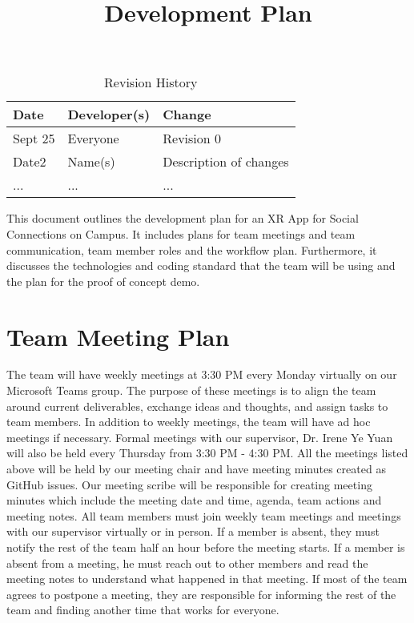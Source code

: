 \documentclass{article}
\title{Development Plan\\\progname}
\author{\authname}
\date{}
\begin{document}
\maketitle

\begin{table}[hp]
\caption{Revision History} \label{TblRevisionHistory}
\begin{tabularx}{\textwidth}{llX}
\toprule
\textbf{Date} & \textbf{Developer(s)} & \textbf{Change}\\
\midrule
Sept 25 & Everyone & Revision 0\\
Date2 & Name(s) & Description of changes\\
... & ... & ...\\
\bottomrule
\end{tabularx}
\end{table}

This document outlines the development plan for an XR App for Social Connections on Campus. It includes plans for team meetings and team communication, team member roles and the workflow plan.  Furthermore,  it discusses the technologies and coding standard that the team will be using and the plan for the proof of concept demo. 

\section{Team Meeting Plan}
\quad The team will have weekly meetings at 3:30 PM every Monday virtually on our Microsoft Teams group. The purpose of these meetings is to align the team around current deliverables, exchange ideas and thoughts, and assign tasks to team members. In addition to weekly meetings,  the team will have ad hoc meetings if necessary. Formal meetings with our supervisor, Dr. Irene Ye Yuan will also be held every Thursday from 3:30 PM - 4:30 PM.  All the meetings listed above will be held by our meeting chair and have meeting minutes created as GitHub issues. Our meeting scribe will be responsible for creating meeting minutes which include the meeting date and time,  agenda, team actions and meeting notes.
\quad All team members must join weekly team meetings and meetings with our supervisor virtually or in person.  If a member is absent,  they must notify the rest of the team half an hour before the meeting starts.  If a member is absent from a meeting,  he must reach out to other members and read the meeting notes to understand what happened in that meeting.  If most of the team agrees to postpone a meeting,  they are responsible for informing the rest of the team and finding another time that works for everyone.
\end{document}
